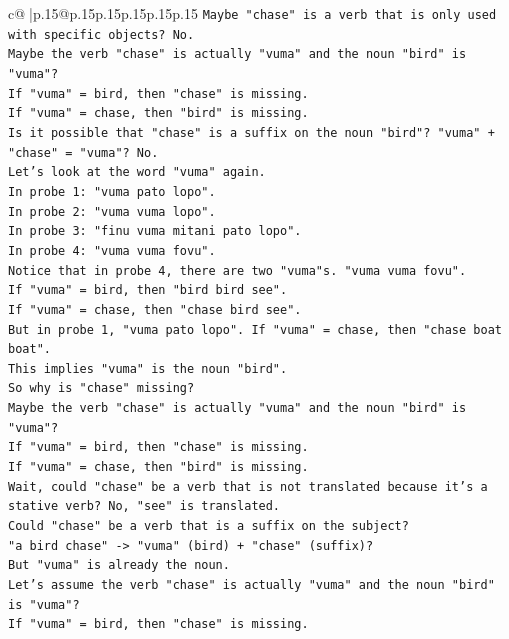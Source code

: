 \documentclass{article}
\begin{document}
{\begin{supertabular}{c@{$\;$}|p{.15\linewidth}@{}p{.15\linewidth}p{.15\linewidth}p{.15\linewidth}p{.15\linewidth}p{.15\linewidth}}
{{{\texttt{Maybe "chase" is a verb that is only used with specific objects? No.} \\
\texttt{Maybe the verb "chase" is actually "vuma" and the noun "bird" is "vuma"?} \\
\texttt{If "vuma" = bird, then "chase" is missing.} \\
\texttt{If "vuma" = chase, then "bird" is missing.} \\
\texttt{Is it possible that "chase" is a suffix on the noun "bird"? "vuma" + "chase" = "vuma"? No.} \\
\texttt{Let's look at the word "vuma" again.} \\
\texttt{In probe 1: "vuma pato lopo".} \\
\texttt{In probe 2: "vuma vuma lopo".} \\
\texttt{In probe 3: "finu vuma mitani pato lopo".} \\
\texttt{In probe 4: "vuma vuma fovu".} \\
\texttt{Notice that in probe 4, there are two "vuma"s. "vuma vuma fovu".} \\
\texttt{If "vuma" = bird, then "bird bird see".} \\
\texttt{If "vuma" = chase, then "chase bird see".} \\
\texttt{But in probe 1, "vuma pato lopo". If "vuma" = chase, then "chase boat boat".} \\
\texttt{This implies "vuma" is the noun "bird".} \\
\texttt{So why is "chase" missing?} \\
\texttt{Maybe the verb "chase" is actually "vuma" and the noun "bird" is "vuma"?} \\
\texttt{If "vuma" = bird, then "chase" is missing.} \\
\texttt{If "vuma" = chase, then "bird" is missing.} \\
\texttt{Wait, could "chase" be a verb that is not translated because it's a stative verb? No, "see" is translated.} \\
\texttt{Could "chase" be a verb that is a suffix on the subject?} \\
\texttt{"a bird chase" {-}> "vuma" (bird) + "chase" (suffix)?} \\
\texttt{But "vuma" is already the noun.} \\
\texttt{Let's assume the verb "chase" is actually "vuma" and the noun "bird" is "vuma"?} \\
\texttt{If "vuma" = bird, then "chase" is missing.} \\
}}}
\end{supertabular}}
\end{document}
